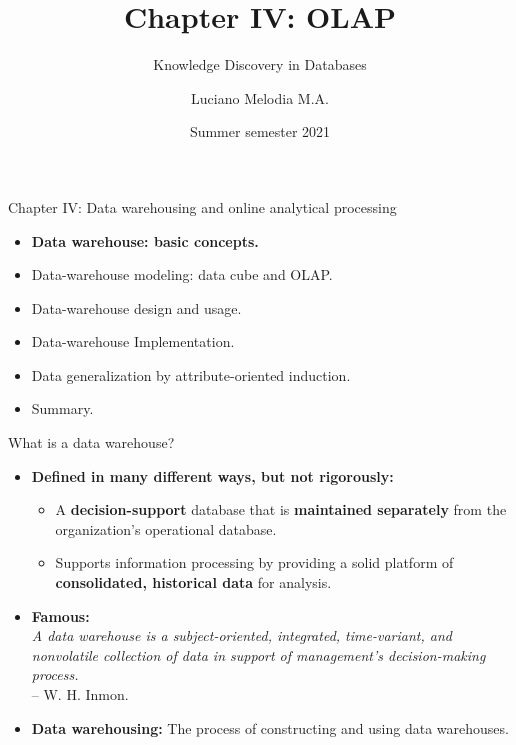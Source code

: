 \documentclass[aspectratio=169,t]{beamer}
\title[KDD]{Chapter IV: OLAP}
\subtitle{Knowledge Discovery in Databases}
\author[L.~Melodia]{Luciano Melodia M.A.}
\institute[Department]{Evolutionary Data Management, Friedrich-Alexander University Erlangen-Nürnberg}
\date{Summer semester 2021}
\begin{document}
  \maketitle

  { 
    \begin{frame}{Chapter IV: Data warehousing and online analytical processing}
        \begin{itemize}
            \item \textbf{Data warehouse: basic concepts.}
            \item Data-warehouse modeling: data cube and OLAP.
            \item Data-warehouse design and usage.
            \item Data-warehouse Implementation.
            \item Data generalization by attribute-oriented induction.
            \item Summary.
        \end{itemize}
    \end{frame}
  }

  { 
    \begin{frame}{What is a data warehouse?}
        \begin{itemize}
            \item \textbf{Defined in many different ways, but not rigorously:}
            \begin{itemize}
              \item A \textbf{\color{airforceblue}decision-support} database that is \textbf{\color{airforceblue}maintained separately} from the organization's operational database.
              \item Supports information processing by providing a solid platform of \textbf{\color{airforceblue}consolidated, historical data} for analysis.
            \end{itemize}
            \item \textbf{Famous:} \\
            \emph{A data warehouse is a {\color{airforceblue}subject-oriented, integrated, time-variant, and nonvolatile} collection of data in support of management's decision-making process.} \\
            -- W. H. Inmon.
            \item \textbf{\color{airforceblue}Data warehousing:} The process of constructing and using data warehouses.
        \end{itemize}
    \end{frame}
  }
\end{document}
